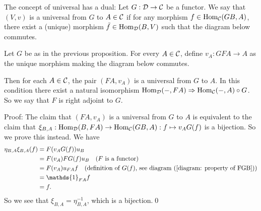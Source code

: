 \begin{itemize}
    \begin{remark}
        The concept of universal has a dual: Let $G:\mathcal{D}\to\mathcal{C}$ be a functor. We say that 
        $(V,v)$ is a universal from $G$ to $A\in\mathcal{C}$ if for any morphism 
        $f\in\text{Hom}_{\mathcal{C}}(GB,A)$, there exist a (unique) morphism $\tilde{f}\in\text{Hom}_{\mathcal{D}}(B,V)$ such that 
        the diagram below commutes.
        \begin{center}
        \end{center}
    \end{remark}
    \begin{proposition}
        Let $G$ be as in the previous proposition. For every $A\in\mathcal{C}$, define 
        $v_A:GFA\to A$ as the unique morphism making the diagram below commutes.
        \begin{center}
        \end{center}
        Then for each $A\in\mathcal{C}$, the pair $(FA,v_A)$ is a universal from $G$ to $A$. In this condition there exist a natural isomorphism 
        $\text{Hom}_{\mathcal{D}}(-,FA)\Rightarrow \text{Hom}_{\mathcal{C}}(-,A)\circ G$. So we say that $F$ is right adjoint to $G$.
    \end{proposition}
    Proof: The claim that $(FA,v_A)$ is a universal from $G$ to $A$ is equivalent to 
    the claim that $\xi_{B,A}:\text{Hom}_{\mathcal{D}}(B,FA)\to\text{Hom}_{\mathcal{C}}(GB,A):f\mapsto v_AG(f)$ is a bijection. So we prove this instead. 
    We have 
    \begin{equation}
        \begin{split}
            \eta_{B,A}\xi_{B,A}(f)&=F(v_AG(f))u_B\\
            &=F(v_A)FG(f)u_B\quad(F\text{ is a functor})\\
            &=F(v_A)u_{FA}f\quad(\text{definition of }G(f)\text{, see diagram~(\ref{diagram: property of FGB})})\\
            &=\mathds{1}_{FA}f\\
            &=f.
        \end{split}
    \end{equation}
    So we see that $\xi_{B,A}=\eta_{B,A}^{-1}$, which is a bijection.\qed 



\end{itemize}
